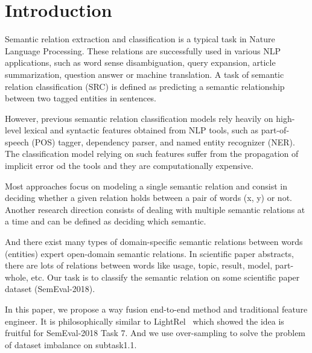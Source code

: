 \section{Introduction}
\label{sec:introduction}

Semantic relation extraction and classification is a typical task in Nature Language Processing. These relations are successfully used in various NLP applications, such as word sense disambiguation, query expansion, article summarization, question answer or machine translation. A task of semantic relation classification (SRC) is defined as predicting a semantic relationship between two tagged entities in sentences.

However, previous semantic relation classification models rely heavily on high-level lexical and syntactic features obtained from NLP tools, such as part-of-speech (POS) tagger, dependency parser, and named entity recognizer (NER). The classification model relying on such features suffer from the propagation of implicit error od the tools and they are computationally expensive.

Most approaches focus on modeling a single semantic relation and consist in deciding whether a given relation holds between a pair of words (x, y) or not. Another research direction consists of dealing with multiple semantic relations at a time and can be defined as deciding which semantic.

And there exist many types of domain-specific semantic relations between words (entities) expert open-domain semantic relations. In scientific paper abstracts, there are lots of relations between words like usage, topic, result, model, part-whole, etc. Our task is to classify the semantic relation on some scientific paper dataset (SemEval-2018).

In this paper, we propose a way fusion end-to-end method and traditional feature engineer. It is philosophically similar to LightRel~\cite{renslow2018lightrel} which showed the idea is fruitful for SemEval-2018 Task 7. And we use over-sampling to solve the problem of dataset imbalance on subtask1.1.